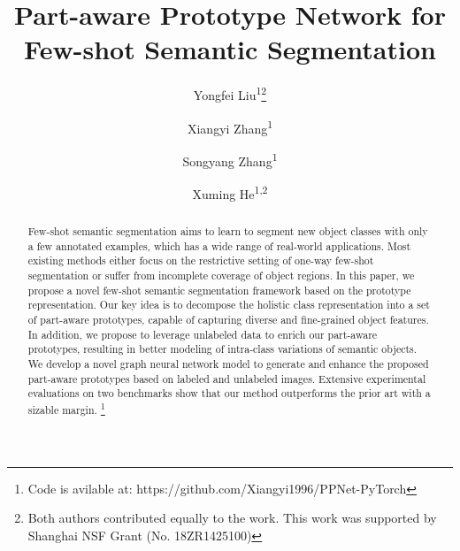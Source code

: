 \documentclass[runningheads]{llncs}
\makeatletter
\newcommand{\printfnsymbol}[1]{\textsuperscript{\@fnsymbol{#1}}}
\makeatother
\begin{document}
\pagestyle{headings}
\mainmatter
\def\ECCVSubNumber{754}  

\title{Part-aware Prototype Network for Few-shot Semantic Segmentation} 

\begin{comment}
\titlerunning{ECCV-20 submission ID \ECCVSubNumber} 
\authorrunning{ECCV-20 submission ID \ECCVSubNumber} 
\author{Anonymous ECCV submission}
\institute{Paper ID \ECCVSubNumber}
\end{comment}





\author{Yongfei Liu\textsuperscript{\rm 1}\thanks{Both authors contributed equally to the work. This work was supported by Shanghai NSF Grant (No. 18ZR1425100)} \and
Xiangyi Zhang\textsuperscript{\rm 1}\printfnsymbol{1} \and
Songyang Zhang\textsuperscript{\rm 1}\and 
Xuming He\textsuperscript{\rm 1,2}}
\maketitle

\begin{abstract}
  Few-shot semantic segmentation aims to learn to segment new object classes with only a few annotated examples, 
  which has a wide range of real-world applications. Most existing methods either focus on the restrictive setting 
  of one-way few-shot segmentation or suffer from incomplete coverage of object regions. In this paper, we propose 
  a novel few-shot semantic segmentation framework based on the prototype representation. Our key idea is to decompose 
  the holistic class representation into a set of part-aware prototypes, capable of capturing diverse and fine-grained 
  object features. In addition, we propose to leverage unlabeled data to enrich our part-aware prototypes, resulting 
  in better modeling of intra-class variations of semantic objects. We develop a novel graph neural network model to 
  generate and enhance the proposed part-aware prototypes based on labeled and unlabeled images. 
  Extensive experimental evaluations on two benchmarks show that our method outperforms the prior art with a sizable margin.
  \footnote{Code is avilable at: https://github.com/Xiangyi1996/PPNet-PyTorch}

\end{abstract}
\end{document}
